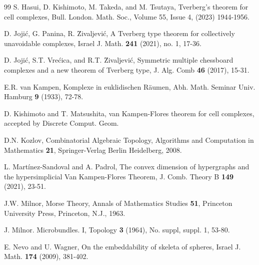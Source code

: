\documentclass[amsfonts]{amsart}
\numberwithin{equation}{section}
\theoremstyle{definition}
\theoremstyle{remark}
\begin{document}
\begin{thebibliography}{99}
     S. Hasui, D. Kishimoto, M. Takeda, and M. Tsutaya, Tverberg's theorem for cell complexes, Bull. London. Math. Soc., Volume 55, Issue 4, (2023) 1944-1956.


     D. Joji\'{c}, G. Panina, R. \u{Z}ivaljevi\'{c}, A Tverberg type theorem for collectively unavoidable complexes, Israel J. Math. \textbf{241} (2021), no. 1, 17-36.

     D. Joji\'{c}, S.T. Vre\'{c}ica, and R.T. \u{Z}ivaljevi\'{c}, Symmetric multiple chessboard complexes and a new theorem of Tverberg type, J. Alg. Comb \textbf{46} (2017), 15-31.

     E.R. van Kampen, Komplexe in euklidischen R\"aumen, Abh. Math. Seminar Univ. Hamburg \textbf{9} (1933), 72-78.


     D. Kishimoto and T. Matsushita, van Kampen-Flores theorem for cell complexes, accepted by Discrete Comput. Geom.

      D.N. Kozlov, Combinatorial Algebraic Topology, Algorithms and Computation in Mathematics \textbf{21}, Springer-Verlag Berlin Heidelberg, 2008.



     L. Mart\'{i}nez-Sandoval and A. Padrol, The convex dimension of hypergraphs and the hypersimplicial Van Kampen-Flores Theorem, J. Comb. Theory B \textbf{149} (2021), 23-51.

     J.W. Milnor, Morse Theory, Annals of Mathematics Studies \textbf{51}, Princeton University Press, Princeton, N.J., 1963.

     J. Milnor. Microbundles. I, Topology \textbf{3} (1964), No. suppl, suppl. 1, 53-80.

     E. Nevo and U. Wagner, On the embeddability of skeleta of spheres, Israel J. Math. \textbf{174} (2009), 381-402.


\end{thebibliography}
\end{document}
